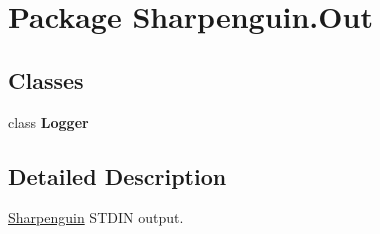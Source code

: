 \hypertarget{namespaceSharpenguin_1_1Out}{\section{Package Sharpenguin.\-Out}
\label{namespaceSharpenguin_1_1Out}
}
\subsection*{Classes}
\begin{DoxyCompactItemize}
\item 
class {\bfseries Logger}
\end{DoxyCompactItemize}


\subsection{Detailed Description}
\hyperlink{namespaceSharpenguin}{Sharpenguin} S\-T\-D\-I\-N output. 